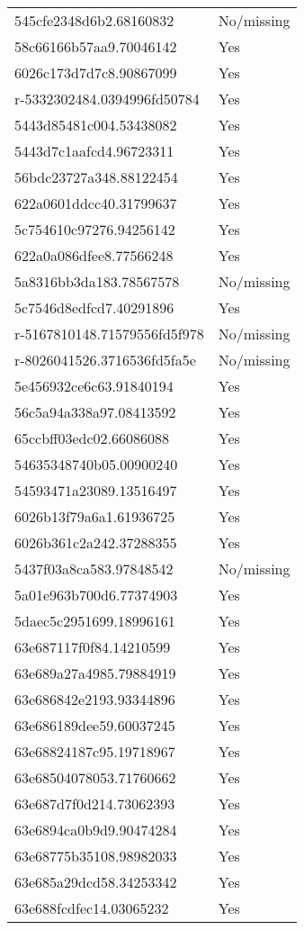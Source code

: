 \begin{tabular}{ll}
545cfe2348d6b2.68160832 & No/missing \\
58c66166b57aa9.70046142 & Yes \\
6026c173d7d7c8.90867099 & Yes \\
r-5332302484.0394996fd50784 & Yes \\
5443d85481c004.53438082 & Yes \\
5443d7c1aafcd4.96723311 & Yes \\
56bdc23727a348.88122454 & Yes \\
622a0601ddcc40.31799637 & Yes \\
5c754610c97276.94256142 & Yes \\
622a0a086dfee8.77566248 & Yes \\
5a8316bb3da183.78567578 & No/missing \\
5c7546d8edfcd7.40291896 & Yes \\
r-5167810148.71579556fd5f978 & No/missing \\
r-8026041526.3716536fd5fa5e & No/missing \\
5e456932ce6c63.91840194 & Yes \\
56c5a94a338a97.08413592 & Yes \\
65ccbff03edc02.66086088 & Yes \\
54635348740b05.00900240 & Yes \\
54593471a23089.13516497 & Yes \\
6026b13f79a6a1.61936725 & Yes \\
6026b361c2a242.37288355 & Yes \\
5437f03a8ca583.97848542 & No/missing \\
5a01e963b700d6.77374903 & Yes \\
5daec5c2951699.18996161 & Yes \\
63e687117f0f84.14210599 & Yes \\
63e689a27a4985.79884919 & Yes \\
63e686842e2193.93344896 & Yes \\
63e686189dee59.60037245 & Yes \\
63e68824187c95.19718967 & Yes \\
63e68504078053.71760662 & Yes \\
63e687d7f0d214.73062393 & Yes \\
63e6894ca0b9d9.90474284 & Yes \\
63e68775b35108.98982033 & Yes \\
63e685a29dcd58.34253342 & Yes \\
63e688fcdfec14.03065232 & Yes \\

\end{tabular}
